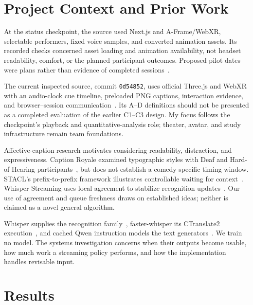 \documentclass[conference,letterpaper]{IEEEtran}
\begin{document}
\section{Project Context and Prior Work}
At the status checkpoint, the source used Next.js and A-Frame/WebXR, selectable performers, fixed voice samples, and converted animation assets. Its recorded checks concerned asset loading and animation availability, not headset readability, comfort, or the planned participant outcomes. Proposed pilot dates were plans rather than evidence of completed sessions~\cite{status}.

The current inspected source, commit \texttt{0d54852}, uses official Three.js and WebXR with an audio-clock cue timeline, preloaded PNG captions, interaction evidence, and browser--session communication~\cite{repo}. Its A--D definitions should not be presented as a completed evaluation of the earlier C1--C3 design. My focus follows the checkpoint's playback and quantitative-analysis role; theater, avatar, and study infrastructure remain team foundations.

Affective-caption research motivates considering readability, distraction, and expressiveness. Caption Royale examined typographic styles with Deaf and Hard-of-Hearing participants~\cite{pataca}, but does not establish a comedy-specific timing window. STACL's prefix-to-prefix framework illustrates controllable waiting for context~\cite{stacl}. Whisper-Streaming uses local agreement to stabilize recognition updates~\cite{whisperstream}. Our use of agreement and queue freshness draws on established ideas; neither is claimed as a novel general algorithm.

Whisper supplies the recognition family~\cite{whisper}, faster-whisper its CTranslate2 execution~\cite{fasterwhisper}, and cached Qwen instruction models the text generators~\cite{qwen,qwen25}. We train no model. The systems investigation concerns when their outputs become usable, how much work a streaming policy performs, and how the implementation handles revisable input.



\section{Results}






\end{document}
